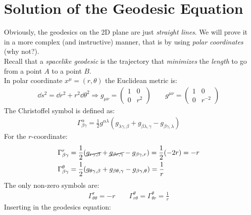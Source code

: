 \documentclass[../template.tex]{subfiles}
\begin{document}
\section{Solution of the Geodesic Equation}
\begin{example}
    Obviously, the geodesics on the 2D plane are just \textit{straight lines}. We will prove it in a more complex (and instructive) manner, that is by using \textit{polar coordinates} (why not?).\\

    Recall that a \textit{spacelike geodesic} is the trajectory that \textit{minimizes} the \textit{length} to go from a point $A$ to a point $B$.\\
    In polar coordinate $x^\mu = (r, \theta)$ the Euclidean metric is:
    \begin{align*}
        \dd{s^2} = \dd{r^2} + r^2 \dd{\theta^2} \Rightarrow g_{\mu \nu} = \left(\begin{array}{cc}
        1 & 0 \\ 
        0 & r^2
        \end{array}\right) \qquad g^{\mu \nu} = \left(\begin{array}{cc}
        1 & 0 \\ 
        0 & r^{-2}
        \end{array}\right)
    \end{align*}     
    The Christoffel symbol is defined as:
    \begin{align*}
        \Gamma^\alpha_{\beta \gamma} = \frac{1}{2} g^{\alpha \lambda}(g_{\lambda \gamma, \beta} + g_{\beta \lambda, \gamma} - g_{\beta \gamma, \lambda}) 
    \end{align*}
    For the $r$-coordinate:
    \begin{align*}
        \Gamma_{\beta \gamma}^r &= \frac{1}{2}(\cancel{g_{r \gamma, \beta} }+ \cancel{g_{\beta r, \gamma}} - g_{\beta \gamma, r})  = \frac{1}{2}(-2r) = -r\\
        \Gamma_{\beta \gamma}^\theta &= \frac{1}{2}(g_{\theta \gamma, \beta} + g_{\beta \theta, \gamma} - g_{\beta \gamma, \theta}) = \frac{1}{r}  
    \end{align*} 
    The only non-zero symbols are:
    \begin{align*}
        \Gamma^r_{\theta \theta} = -r \qquad \Gamma^\theta_{r \theta} = \Gamma^\theta_{\theta r} = \frac{1}{r} 
    \end{align*}
    Inserting in the geodesics equation:
    \begin{align*}

\end{align*}
\end{example}
\end{document}
